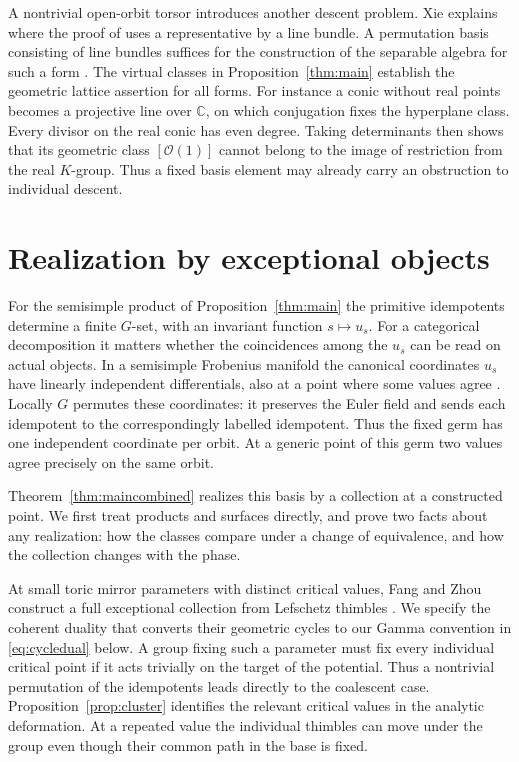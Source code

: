 \documentclass[11pt]{amsart}
\theoremstyle{definition}
\newcommand{\C}{\mathbb C}
\begin{document}
A nontrivial open-orbit torsor introduces another descent problem. Xie explains where the proof of \cite[Proposition~7.9]{MP} uses a representative by a line bundle. A permutation basis consisting of line bundles suffices for the construction of the separable algebra for such a form \cite[Theorem~6.5]{Xie}. The virtual classes in Proposition~\ref{thm:main} establish the geometric lattice assertion for all forms. For instance a conic without real points becomes a projective line over $\C$, on which conjugation fixes the hyperplane class. Every divisor on the real conic has even degree. Taking determinants then shows that its geometric class $[\mathcal O(1)]$ cannot belong to the image of restriction from the real $K$-group. Thus a fixed basis element may already carry an obstruction to individual descent.



\section{Realization by exceptional objects}\label{sec:objects}
For the semisimple product of Proposition~\ref{thm:main} the primitive idempotents determine a finite $G$-set, with an invariant function $s\mapsto u_s$. For a categorical decomposition it matters whether the coincidences among the $u_s$ can be read on actual objects. In a semisimple Frobenius manifold the canonical coordinates $u_s$ have linearly independent differentials, also at a point where some values agree \cite[\S2.5]{GGI}. Locally $G$ permutes these coordinates: it preserves the Euler field and sends each idempotent to the correspondingly labelled idempotent. Thus the fixed germ has one independent coordinate per orbit. At a generic point of this germ two values agree precisely on the same orbit.

Theorem~\ref{thm:maincombined} realizes this basis by a collection at a constructed point. We first treat products and surfaces directly, and prove two facts about any realization: how the classes compare under a change of equivalence, and how the collection changes with the phase.

At small toric mirror parameters with distinct critical values, Fang and Zhou construct a full exceptional collection from Lefschetz thimbles \cite[Proposition~5.4]{FZ}. We specify the coherent duality that converts their geometric cycles to our Gamma convention in \eqref{eq:cycledual} below. A group fixing such a parameter must fix every individual critical point if it acts trivially on the target of the potential. Thus a nontrivial permutation of the idempotents leads directly to the coalescent case. Proposition~\ref{prop:cluster} identifies the relevant critical values in the analytic deformation. At a repeated value the individual thimbles can move under the group even though their common path in the base is fixed.
\end{document}
